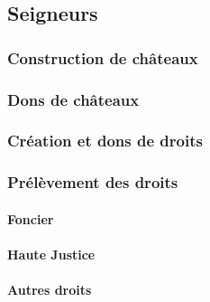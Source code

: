 \subsection{Seigneurs}
	\subsubsection{Construction de châteaux \label{sssec:constru-chateaux}}
	\subsubsection{Dons de châteaux}
	\subsubsection{Création et dons de droits}
	\subsubsection{Prélèvement des droits \label{sssec:collecte-droits}}
		\paragraph{Foncier}
		\paragraph{Haute Justice}
		\paragraph{Autres droits}

\printbibliography[title={Références}]
